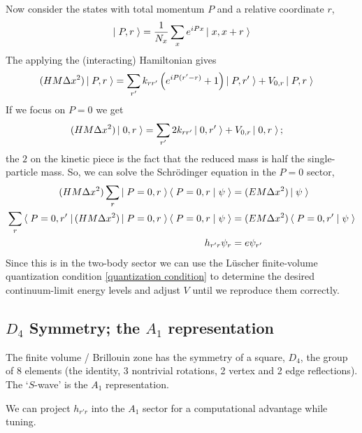 Now consider the states with total momentum $P$ and a relative coordinate $r$,
\begin{align}
	\left|\;P,r\;\right\rangle = \frac{1}{N_x} \sum_x e^{iPx} \left|\;x,x+r\;\right\rangle
\end{align}
The applying the (interacting) Hamiltonian gives
\begin{align}
	(H M\Delta x^2) \left|\;P,r\;\right\rangle
	&=
			\sum_{r'} k_{rr'} \left( e^{iP(r'-r)}+1\right)\left|\;P,r'\;\right\rangle
		+	V_{0,r} \left|\;P,r\;\right\rangle
\end{align}
If we focus on $P=0$ we get
\begin{align}
	(H M\Delta x^2) \left|\;0,r\;\right\rangle
	&=
			\sum_{r'} 2k_{rr'} \left|\;0,r'\;\right\rangle
		+	V_{0,r} \left|\;0,r\;\right\rangle;
\end{align}
the $2$ on the kinetic piece is the fact that the reduced mass is half the single-particle mass.
So, we can solve the Schr\"{o}dinger equation in the $P=0$ sector,
\begin{align}
	(H M\Delta x^2) \sum_r \left|\;P=0,r\;\right\rangle\left\langle\;P=0,r\;\middle|\;\psi\;\right\rangle &= (EM\Delta x^2)\left|\;\psi\;\right\rangle
	\\
	\sum_r \left\langle\;P=0, r'\;\right| (H M \Delta x^2) \left|\;P=0,r\;\right\rangle\left\langle\;P=0,r\;\middle|\;\psi\;\right\rangle &= (E M\Delta x^2)\left\langle\;P=0,r'\;\middle|\;\psi\;\right\rangle
	\\
	h_{r'r} \psi_r &= e \psi_{r'}
\end{align}
Since this is in the two-body sector we can use the L\"{u}scher finite-volume quantization condition \eqref{quantization condition} to determine the desired continuum-limit energy levels and adjust $V$ until we reproduce them correctly.


\subsection{$D_4$ Symmetry; the $A_1$ representation}

The finite volume / Brillouin zone has the symmetry of a square, $D_4$, the group of 8 elements (the identity, 3 nontrivial rotations, 2 vertex and 2 edge reflections).  The `$S$-wave' is the $A_1$ representation.

We can project $h_{r'r}$ into the $A_1$ sector for a computational advantage while tuning.
